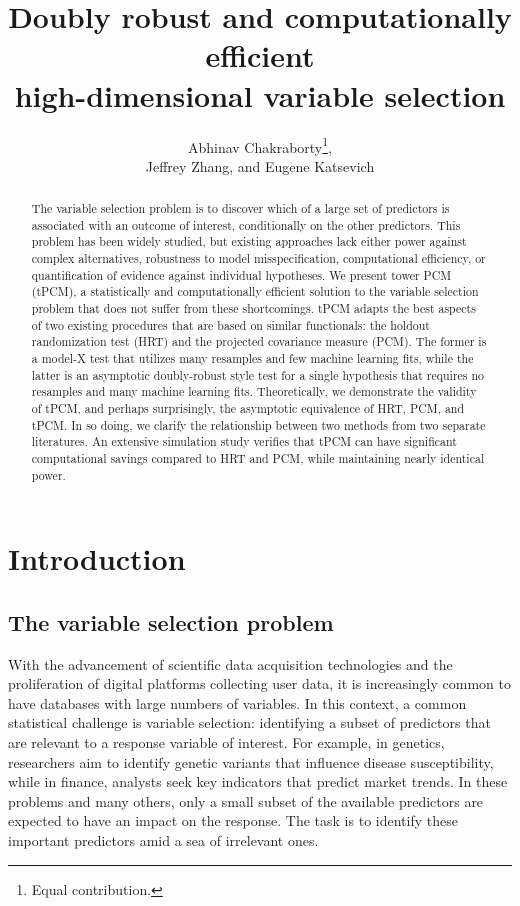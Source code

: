 \documentclass[12pt]{article}
\theoremstyle{definition}
\theoremstyle{remark}
\begin{document}

	
	\title{Doubly robust and computationally efficient \\ high-dimensional variable selection}
	\author{Abhinav Chakraborty\footnote{Equal contribution.},\addtocounter{footnote}{-1} Jeffrey Zhang\footnotemark, and Eugene Katsevich}
	
	\maketitle
	\thispagestyle{empty}
	\begin{abstract}
	The variable selection problem is to discover which of a large set of predictors is associated with an outcome of interest, conditionally on the other predictors. This problem has been widely studied, but existing approaches lack either power against complex alternatives, robustness to model misspecification, computational efficiency, or quantification of evidence against individual hypotheses. We present tower PCM (tPCM), a statistically and computationally efficient solution to the variable selection problem that does not suffer from these shortcomings. tPCM adapts the best aspects of two existing procedures that are based on similar functionals: the holdout randomization test (HRT) and the projected covariance measure (PCM). The former is a model-X test that utilizes many resamples and few machine learning fits, while the latter is an asymptotic doubly-robust style test for a single hypothesis that requires no resamples and many machine learning fits. Theoretically, we demonstrate the validity of tPCM, and perhaps surprisingly, the asymptotic equivalence of HRT, PCM, and tPCM. In so doing, we clarify the relationship between two methods from two separate literatures. An extensive simulation study verifies that tPCM can have significant computational savings compared to HRT and PCM, while maintaining nearly identical power. 
	\end{abstract}
	
	
	\section{Introduction}


	\subsection{The variable selection problem}

	With the advancement of scientific data acquisition technologies and the proliferation of digital platforms collecting user data, it is increasingly common to have databases with large numbers of variables. In this context, a common statistical challenge is variable selection: identifying a subset of predictors that are relevant to a response variable of interest. For example, in genetics, researchers aim to identify genetic variants that influence disease susceptibility, while in finance, analysts seek key indicators that predict market trends. In these problems and many others, only a small subset of the available predictors are expected to have an impact on the response. The task is to identify these important predictors amid a sea of irrelevant ones. 
	
\end{document}
